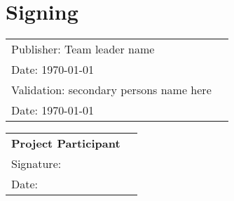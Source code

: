 \section*{Signing}
    \begin{table}[H]
        \begin{tabularx}{\columnwidth}{XX}
            \hline
            Publisher: \alert{Team leader name} \\ Date: \today  \vspace{.5cm} \\ 
            Validation: \alert{secondary persons name here} \\ Date: \today \vspace{.5cm}\\ 
            \hline 
        \end{tabularx}
    \end{table}
    
    
    \begin{table}[H]
        \begin{tabularx}{\columnwidth}{|X|X|}
            \hline
            \multicolumn{1}{|c|}{\textbf{\large Project Participant}}\\
            \vspace{.5cm} Signature: \vspace{1cm} \\ Date: \vspace{.5cm} \\ 
            \hline 
        \end{tabularx}
    \end{table}
    